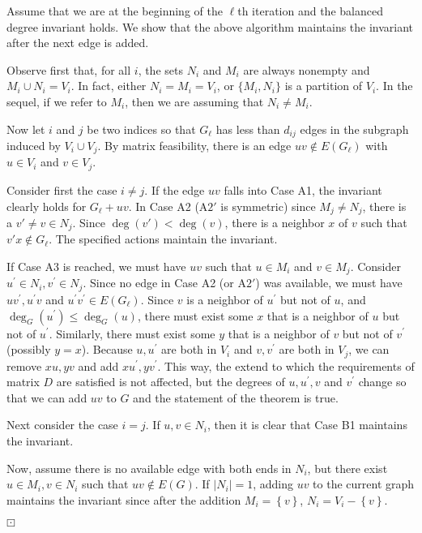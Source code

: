 \documentclass[12pt,a4paper]{article}
\theoremstyle{definition}
\theoremstyle{plain}
\newenvironment{prf}{\noindent {\bf Proof.}}{\begin{flushright}\vspace{-2em}\footnotesize$\boxdot$\normalsize\end{flushright}\smallskip}
\begin{document}
\begin{prf}
Assume that we are at the beginning of the ${\ell}$th iteration and 
the balanced degree invariant holds.  
We show that the above algorithm maintains 
the invariant after the next edge is added.

Observe first that, for all $i$,
the sets $N_i$ and $M_i$ are always nonempty and 
$M_i\cup N_i=V_i$. In fact, either $N_i=M_i=V_i$, 
or $\{M_i,N_i\}$ is a partition of $V_i$. 
In the sequel, if we refer to $M_i$, then we are assuming that $N_i \ne M_i$.

Now let $i$ and $j$ be two indices so that $G_{\ell}$ has less 
than $d_{ij}$ edges in the subgraph induced by $V_i \cup V_j$.  
By matrix feasibility, 
there is an edge $uv \not \in E(G_{\ell})$ with $u \in V_i$ and $v \in V_j$.

Consider first the case $i \neq j$. 
If the edge $uv$ falls into Case A1, 
the invariant clearly holds for $G_{\ell} + uv$.  
In Case A2 (A$2'$ is symmetric) since $M_j \ne N_j$, 
there is a $v' \ne v \in N_j$.  
Since $\deg(v') < \deg(v)$, there is a neighbor $x$ of $v$ 
such that $v'x \not \in G_{\ell}$.  
The specified actions maintain the invariant.

If Case A3 is reached, we must have $uv$ such that $u \in M_i$ and $v \in M_j$. 
Consider $u^{\prime}\in N_i, v^{\prime}\in N_j$.
Since no edge in Case A2 (or A$2'$) was available, 
we must have $uv^{\prime}, u^{\prime}v$ and $u^{\prime}v^{\prime} \in E(G_{\ell})$.
Since $v$ is a neighbor of $u^{\prime}$ but not of $u$,
and $\deg_G(u^{\prime})\leq \deg_G(u)$, 
there must exist some $x$ that is a neighbor of $u$ but not of $u^{\prime}$. 
Similarly, there must exist some $y$ that is a neighbor of $v$ 
but not of $v^{\prime}$ (possibly $y=x$). 
Because $u,u^{\prime}$ are both in $V_i$ 
and $v,v^{\prime}$ are both in $V_j$,
we can remove $xu, yv$ and add $xu^{\prime}, yv^{\prime}$. 
This way, the extend to which the requirements of matrix $D$
are satisfied is not affected, 
but the degrees of $u, u^{\prime}, v$ and $v^{\prime}$ change
so that we can add $uv$ to $G$ and the statement of the theorem is true.

Next consider the case $i=j$. 
If $u,v \in N_i$, then it is clear that Case B1 maintains the invariant.

Now, assume there is no available edge with both ends in $N_i$, 
but there exist $u\in M_i, v\in N_i$ such that $uv\notin E(G)$.
If $|N_i|=1$, adding $uv$ to the current graph maintains 
the invariant since after the addition 
$M_i = \left\{ v \right\}$, $N_i = V_i - \left\{ v \right\}$.


\end{prf}
\end{document}
